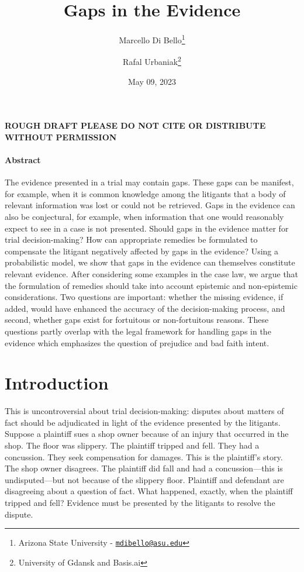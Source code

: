 \documentclass[
  10pt,
  dvipsnames,enabledeprecatedfontcommands]{scrartcl}
\title{Gaps in the Evidence}
\author{Marcello Di Bello\footnote{Arizona State University -
  \href{mailto:mdibello@asu.edu}{\nolinkurl{mdibello@asu.edu}}} \and Rafal
Urbaniak\footnote{University of Gdansk and Basis.ai}}
\date{May 09, 2023}
\begin{document}
\maketitle

\textbf{ROUGH DRAFT PLEASE DO NOT CITE OR DISTRIBUTE WITHOUT PERMISSION}

\paragraph*{Abstract}

The evidence presented in a trial may contain gaps. These gaps can be
manifest, for example, when it is common knowledge among the litigants
that a body of relevant information was lost or could not be retrieved.
Gaps in the evidence can also be conjectural, for example, when
information that one would reasonably expect to see in a case is not
presented. Should gaps in the evidence matter for trial decision-making?
How can appropriate remedies be formulated to compensate the litigant
negatively affected by gaps in the evidence? Using a probabilistic
model, we show that gaps in the evidence can themselves constitute
relevant evidence. After considering some examples in the case law, we
argue that the formulation of remedies should take into account
epistemic and non-epistemic considerations. Two questions are important:
whether the missing evidence, if added, would have enhanced the accuracy
of the decision-making process, and second, whether gaps exist for
fortuitous or non-fortuitous reasons. These questions partly overlap
with the legal framework for handling gaps in the evidence which
emphasizes the question of prejudice and bad faith intent.

\tableofcontents

\hypertarget{introduction}{%
\section{Introduction}\label{introduction}}

This is uncontroversial about trial decision-making: disputes about
matters of fact should be adjudicated in light of the evidence presented
by the litigants. Suppose a plaintiff sues a shop owner because of an
injury that occurred in the shop. The floor was slippery. The plaintiff
tripped and fell. They had a concussion. They seek compensation for
damages. This is the plaintiff's story. The shop owner disagrees. The
plaintiff did fall and had a concussion---this is undisputed---but not
because of the slippery floor. Plaintiff and defendant are disagreeing
about a question of fact. What happened, exactly, when the plaintiff
tripped and fell? Evidence must be presented by the litigants to resolve
the dispute.
\end{document}
